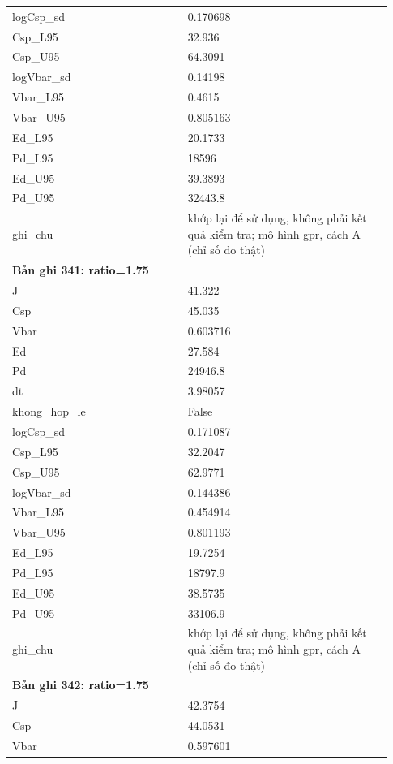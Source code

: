 \begin{longtable}{p{0.43\linewidth}p{0.50\linewidth}}
logCsp\_\allowbreak sd & 0.170698 \\
Csp\_\allowbreak L95 & 32.936 \\
Csp\_\allowbreak U95 & 64.3091 \\
logVbar\_\allowbreak sd & 0.14198 \\
Vbar\_\allowbreak L95 & 0.4615 \\
Vbar\_\allowbreak U95 & 0.805163 \\
Ed\_\allowbreak L95 & 20.1733 \\
Pd\_\allowbreak L95 & 18596 \\
Ed\_\allowbreak U95 & 39.3893 \\
Pd\_\allowbreak U95 & 32443.8 \\
ghi\_\allowbreak chu & khớp lại để sử dụng, không phải kết quả kiểm tra; mô hình gpr, cách A (chỉ số đo thật) \\
\midrule
\multicolumn{2}{p{0.95\linewidth}}{\textbf{Bản ghi 341: ratio=1.75}} \\
J & 41.322 \\
Csp & 45.035 \\
Vbar & 0.603716 \\
Ed & 27.584 \\
Pd & 24946.8 \\
dt & 3.98057 \\
khong\_\allowbreak hop\_\allowbreak le & False \\
logCsp\_\allowbreak sd & 0.171087 \\
Csp\_\allowbreak L95 & 32.2047 \\
Csp\_\allowbreak U95 & 62.9771 \\
logVbar\_\allowbreak sd & 0.144386 \\
Vbar\_\allowbreak L95 & 0.454914 \\
Vbar\_\allowbreak U95 & 0.801193 \\
Ed\_\allowbreak L95 & 19.7254 \\
Pd\_\allowbreak L95 & 18797.9 \\
Ed\_\allowbreak U95 & 38.5735 \\
Pd\_\allowbreak U95 & 33106.9 \\
ghi\_\allowbreak chu & khớp lại để sử dụng, không phải kết quả kiểm tra; mô hình gpr, cách A (chỉ số đo thật) \\
\midrule
\multicolumn{2}{p{0.95\linewidth}}{\textbf{Bản ghi 342: ratio=1.75}} \\
J & 42.3754 \\
Csp & 44.0531 \\
Vbar & 0.597601 \\

\end{longtable}

